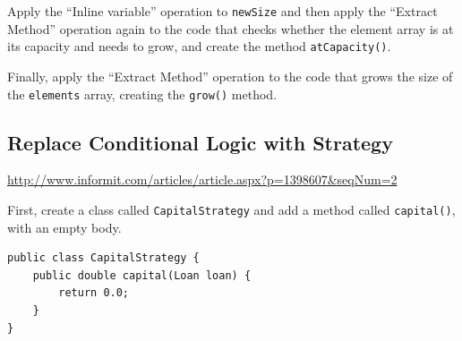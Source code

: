 \documentclass[a4paper,11pt]{memoir}
\newcommand{\code}[1]{\lstinline{#1}}
\begin{document}
\begin{exercise}
	Apply the ``Inline variable'' operation to \code{newSize} and then apply the ``Extract Method'' operation again to the code that checks whether the element array is at its capacity and needs to grow, and create the method \code{atCapacity()}.
\end{exercise}

\begin{exercise}
	Finally, apply the ``Extract Method'' operation to the code that grows the size of the \code{elements} array, creating the \code{grow()} method.
\end{exercise}

\begin{solution}
	
\end{solution}

\newpage

\subsection{Replace Conditional Logic with Strategy}

\url{http://www.informit.com/articles/article.aspx?p=1398607&seqNum=2}


\lstset{caption=The Loan Class,label=lst:loan,float=htbp}

	

\begin{exercise}
	First, create a class called \code{CapitalStrategy} and add a method called \code{capital()}, with an empty body. 
\end{exercise}
\begin{solution}
\begin{lstlisting}[caption=cap,label=lst:lab,float=htbp]
public class CapitalStrategy {
    public double capital(Loan loan) {
        return 0.0;
    }
}
\end{lstlisting}
\end{solution}
\end{document}
